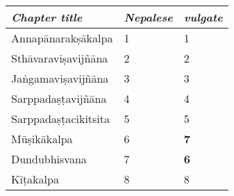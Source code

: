 \documentclass{book}
\begin{document}
   \thispagestyle{empty} 
   
    \begin{table}[h]
        \centering
        \begin{tabular}{lll}
            \emph{Chapter title} & \emph{Nepalese} & \emph{vulgate}   \\
            \midrule
            Annapānarakṣākalpa   &  1 &  1 \\
            Sthāvaraviṣavijñāna & 2 &  2\\
            Jaṅgamaviṣavijñāna &  3 & 3 \\
            Sarppadaṣṭavijñāna & 4  &  4 \\
            Sarppadaṣṭacikitsita & 5 & 5 \\
            Mūṣikākalpa &  {6} & \textbf{7} \\
            Dundubhisvana & {7} & \textbf{6} \\
            Kīṭakalpa & 8 & 8 \\
            \bottomrule  
        \end{tabular}
    \end{table}
    
\end{document}
